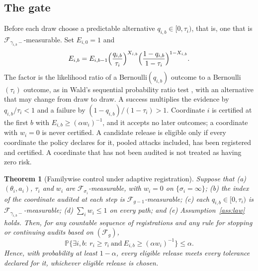 \documentclass{jpc}
\newtheorem{theorem}[thm]{Theorem}
\theoremstyle{remark}
\newcommand{\Prob}{\mathbb P}
\newcommand{\F}{\mathcal F}
\begin{document}
\subsection{The gate}
Before each draw choose a predictable alternative $q_{i,b}\in[0,\tau_i)$, that is, one that is $\F_{\gamma_{i,b}-}$-measurable. Set $E_{i,0}=1$ and
\begin{equation}\label{eq:bet}
E_{i,b}=E_{i,b-1}\Bigl(\frac{q_{i,b}}{\tau_i}\Bigr)^{X_{i,b}}\Bigl(\frac{1-q_{i,b}}{1-\tau_i}\Bigr)^{1-X_{i,b}} .
\end{equation}
The factor is the likelihood ratio of a Bernoulli$(q_{i,b})$ outcome to a Bernoulli$(\tau_i)$ outcome, as in Wald's sequential probability ratio test \cite{wald1945}, with an alternative that may change from draw to draw. A success multiplies the evidence by $q_{i,b}/\tau_i<1$ and a failure by $(1-q_{i,b})/(1-\tau_i)>1$. Coordinate $i$ is certified at the first $b$ with $E_{i,b}\ge(\alpha w_i)^{-1}$, and it accepts no later outcomes; a coordinate with $w_i=0$ is never certified. A candidate release is eligible only if every coordinate the policy declares for it, pooled attacks included, has been registered and certified. A coordinate that has not been audited is not treated as having zero risk.

\begin{theorem}[Familywise control under adaptive registration]\label{thm:gate}
Suppose that (a) $(\theta_i,a_i)$, $\tau_i$ and $w_i$ are $\F_{\sigma_i}$-measurable, with $w_i=0$ on $\{\sigma_i=\infty\}$; (b) the index of the coordinate audited at each step is $\F_{g-1}$-measurable; (c) each $q_{i,b}\in[0,\tau_i)$ is $\F_{\gamma_{i,b}-}$-measurable; (d) $\sum_iw_i\le1$ on every path; and (e) Assumption~\ref{ass:law} holds. Then, for any countable sequence of registrations and any rule for stopping or continuing audits based on $(\F_g)$,
\begin{equation}\label{eq:family}
\Prob\bigl\{\exists i,b:\ r_i\ge\tau_i\ \text{and}\ E_{i,b}\ge(\alpha w_i)^{-1}\bigr\}\le\alpha .
\end{equation}
Hence, with probability at least $1-\alpha$, every eligible release meets every tolerance declared for it, whichever eligible release is chosen.
\end{theorem}
\end{document}
